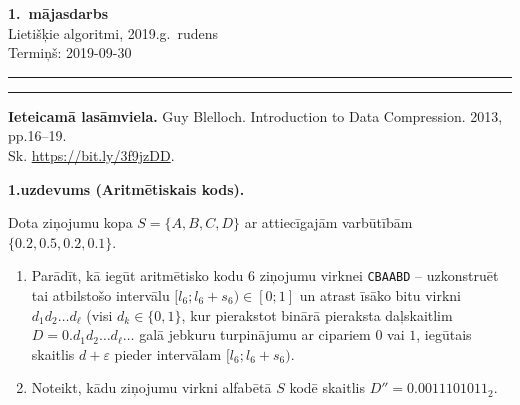 \documentclass[a4paper,12pt]{article}
\begin{document}
\thispagestyle{empty}

\begin{center}
{\bf\Huge 1.\ mājasdarbs} \\[5pt]
Lietišķie algoritmi, 2019.g.\ rudens\\
Termiņš: 2019-09-30
\end{center}

\hrule
\vspace{2pt}
\hrule
\vspace{12pt}


{\bf Ieteicamā lasāmviela.} Guy Blelloch. Introduction to Data Compression. 2013, pp.16--19.\\
Sk. \url{https://bit.ly/3f9jzDD}.


\vspace{10pt}
{\bf 1.uzdevums (Aritmētiskais kods).}

Dota ziņojumu kopa $S = \{ A,B,C,D \}$ ar attiecīgajām varbūtībām 
$\{ 0.2, 0.5, 0.2, 0.1 \}$.
\begin{enumerate}
\item Parādīt, kā iegūt aritmētisko kodu $6$ ziņojumu virknei {\tt CBAABD} -- uzkonstruēt
tai atbilstošo intervālu $[l_6;l_6+s_6) \in [0;1]$ un atrast 
īsāko bitu virkni $d_1d_2\ldots{}d_{\ell}$ (visi $d_k \in \{ 0,1 \}$, 
kur pierakstot binārā pieraksta daļskaitlim $D = 0.d_1d_2\ldots{}d_{\ell}\ldots$ 
galā jebkuru turpinājumu ar cipariem $0$ vai $1$, iegūtais skaitlis $d+\varepsilon$ pieder
intervālam $[l_6;l_6+s_6)$.
\item Noteikt, kādu ziņojumu virkni alfabētā $S$ kodē skaitlis 
$D'' = 0.0011101011_2$.
\end{enumerate}
\end{document}

